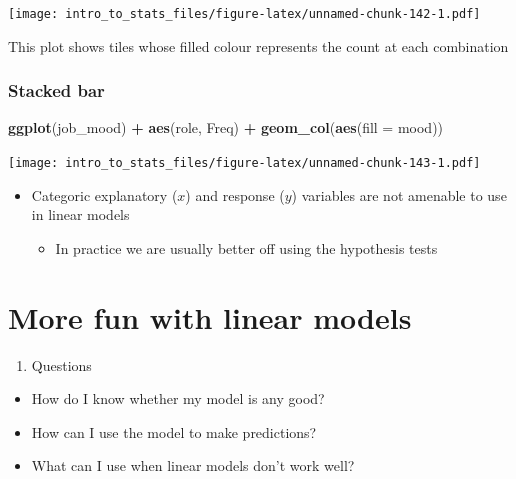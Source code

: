 \documentclass[
]{book}
\newenvironment{Shaded}{\begin{snugshade}}{\end{snugshade}}
\newcommand{\DataTypeTok}[1]{\textcolor[rgb]{0.13,0.29,0.53}{#1}}
\newcommand{\KeywordTok}[1]{\textcolor[rgb]{0.13,0.29,0.53}{\textbf{#1}}}
\newcommand{\NormalTok}[1]{#1}
\newcommand{\OperatorTok}[1]{\textcolor[rgb]{0.81,0.36,0.00}{\textbf{#1}}}
\newcommand{\StringTok}[1]{\textcolor[rgb]{0.31,0.60,0.02}{#1}}
\providecommand{\tightlist}{%
  \setlength{\itemsep}{0pt}\setlength{\parskip}{0pt}}
\newenvironment{roundup}
{ \begin{tcolorbox}[colbacktitle=yellow!50!white,
title=Round Up,coltitle=black,
fonttitle=\bfseries] }
{  \end{tcolorbox} }
\begin{document}
\texttt{[image: intro\_to\_stats\_files/figure-latex/unnamed-chunk-142-1.pdf]}

This plot shows tiles whose filled colour represents the count at each combination

\hypertarget{stacked-bar}{%
\subsection{Stacked bar}\label{stacked-bar}}

\begin{Shaded}
\begin{Highlighting}[]
\KeywordTok{ggplot}\NormalTok{(job_mood) }\OperatorTok{+}\StringTok{ }\KeywordTok{aes}\NormalTok{(role, Freq) }\OperatorTok{+}\StringTok{ }\KeywordTok{geom_col}\NormalTok{(}\KeywordTok{aes}\NormalTok{(}\DataTypeTok{fill =}\NormalTok{ mood))}
\end{Highlighting}
\end{Shaded}

\texttt{[image: intro\_to\_stats\_files/figure-latex/unnamed-chunk-143-1.pdf]}

\begin{roundup}
\begin{itemize}
\tightlist
\item
  Categoric explanatory (\(x\)) and response (\(y\)) variables are not amenable to use in linear models

  \begin{itemize}
  \tightlist
  \item
    In practice we are usually better off using the hypothesis tests
  \end{itemize}
\end{itemize}
\end{roundup}

\hypertarget{more-fun-with-linear-models}{%
\chapter{More fun with linear models}\label{more-fun-with-linear-models}}

\begin{enumerate}
\def\labelenumi{\arabic{enumi}.}
\tightlist
\item
  Questions
\end{enumerate}

\begin{itemize}
\tightlist
\item
  How do I know whether my model is any good?
\item
  How can I use the model to make predictions?
\item
  What can I use when linear models don't work well?
\end{itemize}
\end{document}
